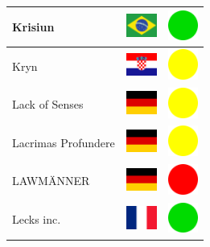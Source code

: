 \documentclass[12pt, a4paper, twoside]{report}
\begin{document}
\begin{center}
\begin{longtable}{|p{5cm}|p{2cm}|p{2cm}|}
Krisiun & \includegraphics[width=1cm]{4x3/br} & \includegraphics[width=1cm]{likes/y} \\ \hline
Kryn & \includegraphics[width=1cm]{4x3/hr} & \includegraphics[width=1cm]{likes/m} \\ \hline
Lack of Senses & \includegraphics[width=1cm]{4x3/de} & \includegraphics[width=1cm]{likes/m} \\ \hline
Lacrimas Profundere & \includegraphics[width=1cm]{4x3/de} & \includegraphics[width=1cm]{likes/m} \\ \hline
LAWMÄNNER & \includegraphics[width=1cm]{4x3/de} & \includegraphics[width=1cm]{likes/n} \\ \hline
Lecks inc. & \includegraphics[width=1cm]{4x3/fr} & \includegraphics[width=1cm]{likes/y} \\ \hline

\end{longtable}
\end{center}
\end{document}

